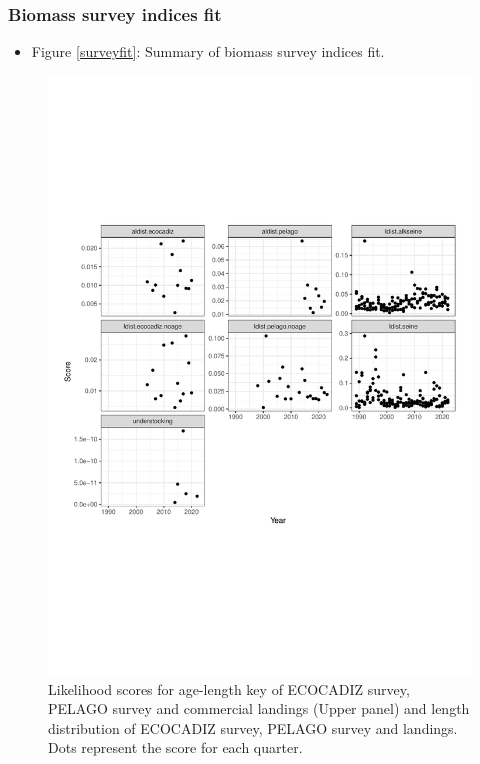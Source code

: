 \documentclass[review]{elsarticle}
\begin{document}
\subsubsection*{Biomass survey indices fit}
\begin{itemize}
\item Figure \ref{surveyfit}: Summary of biomass survey indices fit. 
\end{itemize}

\begin{figure}[h!]
 \centering
 \includegraphics[bb=0 0 595 841]{./likelihood.pdf}
  \caption{Likelihood scores for age-length key of ECOCADIZ survey, PELAGO survey and commercial landings (Upper panel) and length distribution of ECOCADIZ survey, PELAGO survey and landings. Dots represent the score for each quarter.}
 \label{like}
\end{figure}
\end{document}
